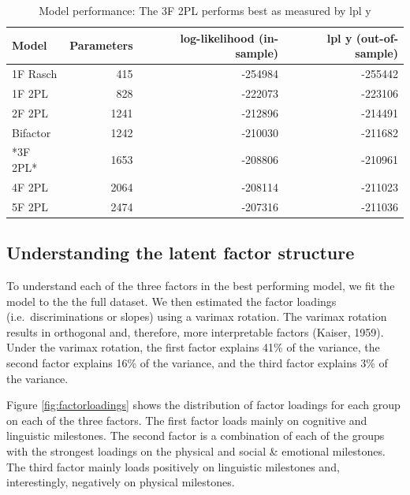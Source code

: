 \documentclass[10pt, letterpaper]{article}
\newenvironment{CodeChunk}{}{}
\begin{document}
\begin{CodeChunk}
\begin{table}[!h]

\caption{\label{tab:results}Model performance: The 3F 2PL performs best as measured by lpl y}
\centering
\fontsize{8}{10}\selectfont
\begin{tabular}[t]{lrrr}
\toprule
Model & Parameters & log-likelihood (in-sample) & lpl y (out-of-sample)\\
\midrule
1F Rasch & 415 & -254984 & -255442\\
1F 2PL & 828 & -222073 & -223106\\
2F 2PL & 1241 & -212896 & -214491\\
Bifactor & 1242 & -210030 & -211682\\
*3F 2PL* & 1653 & -208806 & -210961\\
4F 2PL & 2064 & -208114 & -211023\\
5F 2PL & 2474 & -207316 & -211036\\
\bottomrule
\end{tabular}
\end{table}

\end{CodeChunk}

\hypertarget{understanding-the-latent-factor-structure}{%
\subsection{Understanding the latent factor
structure}\label{understanding-the-latent-factor-structure}}

To understand each of the three factors in the best performing model, we
fit the model to the the full dataset. We then estimated the factor
loadings (i.e.~discriminations or slopes) using a varimax rotation. The
varimax rotation results in orthogonal and, therefore, more
interpretable factors (Kaiser, 1959). Under the varimax rotation, the
first factor explains 41\% of the variance, the second factor explains
16\% of the variance, and the third factor explains 3\% of the variance.

Figure \ref{fig:factorloadings} shows the distribution of factor
loadings for each group on each of the three factors. The first factor
loads mainly on cognitive and linguistic milestones. The second factor
is a combination of each of the groups with the strongest loadings on
the physical and social \& emotional milestones. The third factor mainly
loads positively on linguistic milestones and, interestingly, negatively
on physical milestones.
\end{document}
